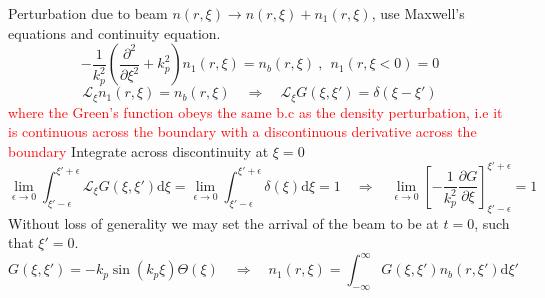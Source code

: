 \documentclass[%
onecolumn, notitlepage,
 amsmath,amssymb,
 aps,
]{article}
\begin{document}
Perturbation due to beam $n\left(r,\xi \right)\to n\left(r,\xi \right)+n_1\left(r,\xi \right)$, use Maxwell's equations and continuity equation.
\begin{equation}
-\frac{1}{k_p^2}\left(\frac{\partial^2 }{\partial \xi^2}+k_p^2\right)n_1\left(r,\xi \right)=n_b\left(r,\xi \right) ~,~~n_1\left(r,\xi<0 \right)=0
\end{equation}
\begin{equation}
\mathcal{L}_{\xi}n_1\left(r,\xi \right)=n_b\left(r,\xi \right) \quad \Rightarrow \quad \mathcal{L}_{\xi}G\left(\xi,\xi'\right)=\delta\left(\xi-\xi'\right)
\end{equation}
\textcolor{red}{where the Green's function obeys the same b.c as the density perturbation, i.e it is continuous across the boundary with a discontinuous derivative across the boundary}
Integrate across discontinuity at $\xi=0$
\begin{equation}
\lim_{\epsilon\to 0}\int_{\xi'-\epsilon}^{\xi'+\epsilon} \mathcal{L}_{\xi}G\left(\xi,\xi'\right)\mathrm{d}\xi=\lim_{\epsilon\to 0}\int_{\xi'-\epsilon}^{\xi'+\epsilon}\delta\left(\xi\right)\mathrm{d}\xi=1 \quad \Rightarrow \quad \lim_{\epsilon\to 0}\left[-\frac{1}{k_p^2}\frac{\partial G}{\partial \xi}\right]^{\xi'+\epsilon}_{\xi'-\epsilon}=1
\end{equation}
Without loss of generality we may set the arrival of the beam to be at $t=0$, such that $\xi'=0$.
\begin{equation}
G\left(\xi,\xi'\right)=-k_p\sin\left(k_p\xi \right)\Theta\left(\xi \right) \quad \Rightarrow \quad n_1\left(r,\xi \right)=\int_{-\infty}^{\infty}G\left(\xi,\xi'\right)n_b\left(r,\xi' \right) \mathrm{d}\xi'
\end{equation}
\end{document}
